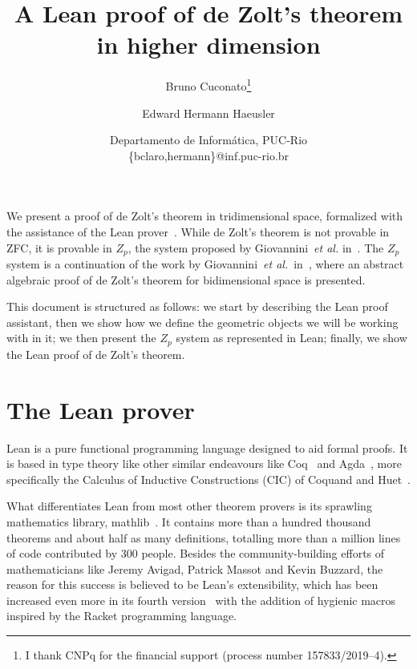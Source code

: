 \documentclass[12pt]{article} %
\title{A Lean proof of de Zolt's theorem in higher dimension} %
\author{Bruno Cuconato\thanks{I thank CNPq for the financial support (process number 157833/2019–4).} \and Edward Hermann Haeusler} %
\date{Departamento de Informática, PUC-Rio\\ \{bclaro,hermann\}@inf.puc-rio.br}
\begin{document}
\maketitle %

{ %

\def\lstlanguagefiles{lstlean.tex}
\newcommand{\leanline}[1]{\lstinline[language=lean]{#1}} %
{\lstset{language=lean}}
{} %


\newcommand{\point}{\leanline{Point}} %
\newcommand{\segment}{\leanline{Segment}} %
\newcommand{\psegment}{\leanline{PolySegment}} %
\newcommand{\face}{\leanline{Face}} %
\newcommand{\pface}{\leanline{PolyFace}} %
\newcommand{\volume}{\leanline{Volume}} %
\newcommand{\pvolume}{\leanline{PolyVolume}} %
\newcommand{\truncof}{\leanline{TruncationOf}} %
\newcommand{\zp}{\ensuremath{Z_{p}}}

We present a proof of de Zolt's theorem in tridimensional space, formalized with the assistance of the Lean prover~\cite{demoura2015lean,demoura21lean4}. %
While de Zolt's theorem is not provable in ZFC, it is provable in \(Z_{p}\), the system proposed by Giovannini~\textit{et al.} in~\cite[§5]{giovannini2021postulado}. %
The \(Z_{p}\) system is a continuation of the work by Giovannini~\textit{et al.}~in~\cite{giovannini2022zolt}, where an abstract algebraic proof of de Zolt's theorem for bidimensional space is presented. %

This document is structured as follows: we start by describing the Lean proof assistant, then we show how we define the geometric objects we will be working with in it; we then present the \(Z_{p}\) system as represented in Lean; finally, we show the Lean proof of de Zolt's theorem. %

\section{The Lean prover}\label{sec:about-lean} %

Lean is a pure functional programming language designed to aid formal proofs. %
It is based in type theory like other similar endeavours like Coq~\cite{coq2017} and Agda~\cite{norell2007agda-thesis}, more specifically the Calculus of Inductive Constructions (CIC) of Coquand and Huet~\cite{coquand1988calculus}. %

What differentiates Lean from most other theorem provers is its sprawling mathematics library, mathlib~\cite{mathlib2020}. %
It contains more than a hundred thousand theorems and about half as many definitions, totalling more than a million lines of code contributed by 300 people. %
Besides the community-building efforts of mathematicians like Jeremy Avigad, Patrick Massot and Kevin Buzzard,  the reason for this success is believed to be Lean's extensibility, which has been increased even more in its fourth version~\cite{demoura21lean4} with the addition of hygienic macros~\cite{ullrich2020leanmacros} inspired by the Racket programming language. %

}
\end{document}
